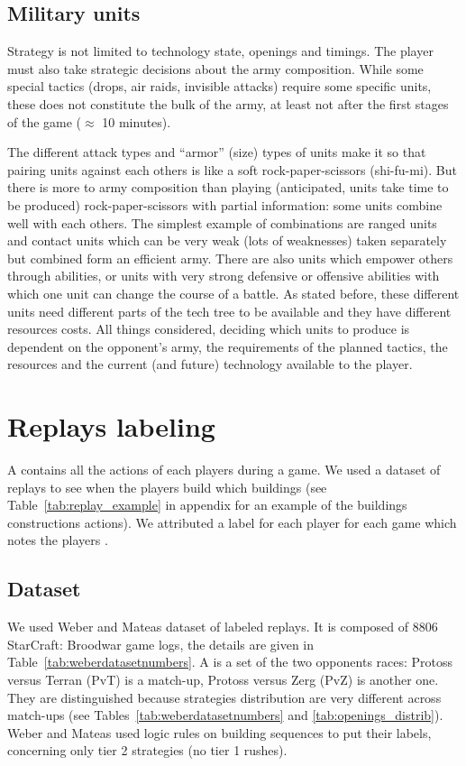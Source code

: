 \subsection{Military units}
\label{sec:militaryunits}
Strategy is not limited to technology state, openings and timings. The player must also take strategic decisions about the army composition. While some special tactics (drops, air raids, invisible attacks) require some specific units, these does not constitute the bulk of the army, at least not after the first stages of the game ($\approx$ 10 minutes).

The different attack types and ``armor'' (size) types of units make it so that pairing units against each others is like a soft rock-paper-scissors (shi-fu-mi). But there is more to army composition than playing (anticipated, units take time to be produced) rock-paper-scissors with partial information: some units combine well with each others. The simplest example of combinations are ranged units and contact units which can be very weak (lots of weaknesses) taken separately but combined form an efficient army. There are also units which empower others through abilities, or units with very strong defensive or offensive abilities with which one unit can change the course of a battle. As stated before, these different units need different parts of the tech tree to be available and they have different resources costs. All things considered, deciding which units to produce is dependent on the opponent's army, the requirements of the planned tactics, the resources and the current (and future) technology available to the player.

\section{Replays labeling}
\label{sec:replayslabeling}

A  contains all the actions of each players during a game. We used a dataset of replays to see when the players build which buildings (see Table~\ref{tab:replay_example} in appendix for an example of the buildings constructions actions). We attributed a label for each player for each game which notes the players .

\subsection{Dataset}

We used Weber and Mateas \citep{weberStrat} dataset of labeled replays. It is composed of 8806 StarCraft: Broodwar game logs, the details are given in Table~\ref{tab:weberdatasetnumbers}. A  is a set of the two opponents races: Protoss versus Terran (PvT) is a match-up, Protoss versus Zerg (PvZ) is another one. They are distinguished because strategies distribution are very different across match-ups (see Tables~\ref{tab:weberdatasetnumbers} and \ref{tab:openings_distrib}). Weber and Mateas used logic rules on building sequences to put their labels, concerning only tier 2 strategies (no tier 1 rushes).

